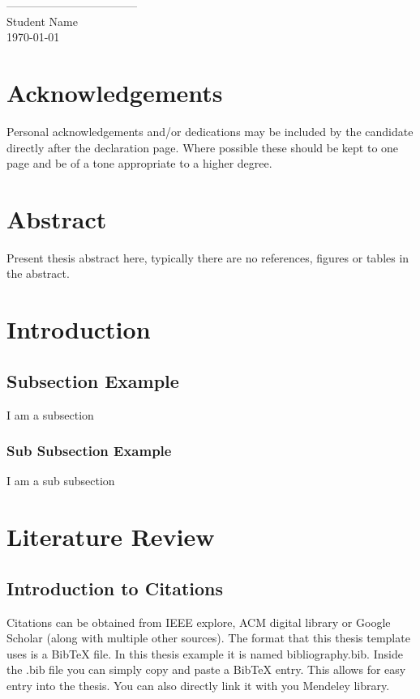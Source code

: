\documentclass[12pt]{article}
\begin{document}
\vspace{2cm}
\begin{flushright}
-----------------------------------\\
Student Name\\
\today
\end{flushright}
\pagebreak

\section*{Acknowledgements}
Personal acknowledgements and/or dedications may be included by the candidate directly after the declaration page. Where possible these should be kept to one page and be of a tone appropriate to a higher degree.
\pagebreak

\listoffigures
\pagebreak
 
\listoftables
\pagebreak


\tableofcontents
\pagebreak

\section*{Abstract}
Present thesis abstract here, typically there are no references, figures or tables in the abstract.
\pagebreak




\section{Introduction}
\subsection{Subsection Example}
I am a subsection
\subsubsection{Sub Subsection Example}
I am a sub subsection
\pagebreak




\section{Literature Review}
\subsection{Introduction to Citations}
Citations can be obtained from IEEE explore, ACM digital library or Google Scholar (along with multiple other sources). The format that this thesis template uses is a BibTeX file. In this thesis example it is named bibliography.bib. Inside the .bib file you can simply copy and paste a BibTeX entry. This allows for easy entry into the thesis. You can also directly link it with you Mendeley library.
\end{document}
